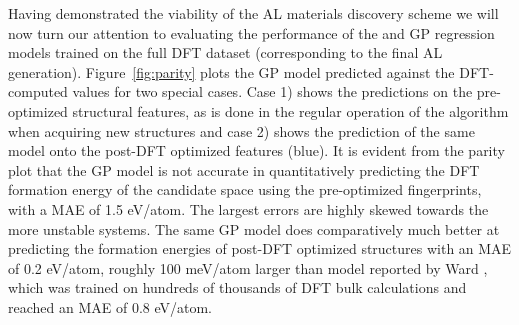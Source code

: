 


Having demonstrated the viability of the AL materials discovery scheme we will now turn our attention to evaluating the performance of the \IrOtwo and \IrOthree GP regression models trained on the full DFT dataset (corresponding to the final AL generation).
%
Figure~\ref{fig:parity} plots the GP model predicted \DHf against the DFT-computed values for two special cases.
%
Case 1) shows the predictions on the pre-optimized structural features, as is done in the regular operation of the algorithm when acquiring new structures and
case 2) shows the prediction of the same model onto the post-DFT optimized features (blue).
%
It is evident from the parity plot that the GP model is not accurate in quantitatively predicting the DFT formation energy of the candidate space using the pre-optimized fingerprints,
with a MAE of \mytilde\num{1.5} eV/atom.
%
The largest errors are highly skewed towards the more unstable systems.
%
The same GP model does comparatively much better at predicting the formation energies of post-DFT optimized structures with an MAE of \mytilde\num{0.2} eV/atom,
roughly 100 meV/atom larger than model reported by Ward , which was trained on hundreds of thousands of DFT bulk calculations and reached an MAE of 0.8 eV/atom.
%


